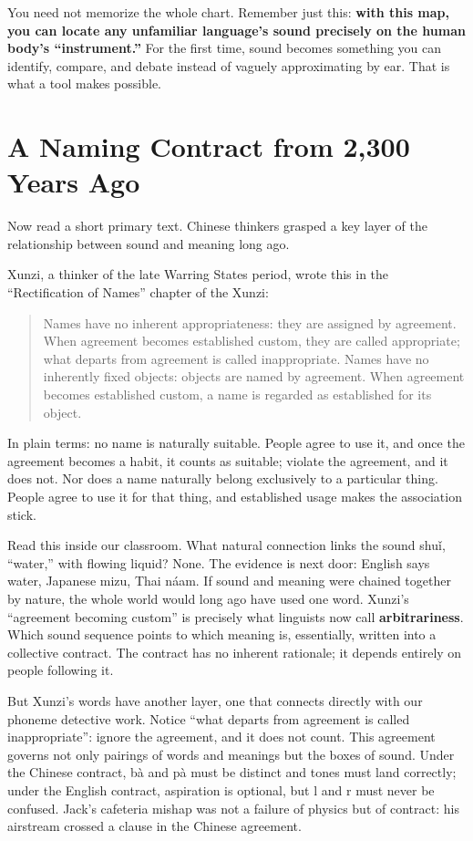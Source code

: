 You need not memorize the whole chart. Remember just this: \textbf{with this map, you can locate any unfamiliar language's sound precisely on the human body's ``instrument.''} For the first time, sound becomes something you can identify, compare, and debate instead of vaguely approximating by ear. That is what a tool makes possible.

\section{A Naming Contract from 2,300 Years Ago}
Now read a short primary text. Chinese thinkers grasped a key layer of the relationship between sound and meaning long ago.

Xunzi, a thinker of the late Warring States period, wrote this in the ``Rectification of Names'' chapter of the Xunzi:

\begin{quote}
Names have no inherent appropriateness: they are assigned by agreement. When agreement becomes established custom, they are called appropriate; what departs from agreement is called inappropriate. Names have no inherently fixed objects: objects are named by agreement. When agreement becomes established custom, a name is regarded as established for its object.
\end{quote}
In plain terms: no name is naturally suitable. People agree to use it, and once the agreement becomes a habit, it counts as suitable; violate the agreement, and it does not. Nor does a name naturally belong exclusively to a particular thing. People agree to use it for that thing, and established usage makes the association stick.

Read this inside our classroom. What natural connection links the sound shuǐ, ``water,'' with flowing liquid? None. The evidence is next door: English says water, Japanese mizu, Thai náam. If sound and meaning were chained together by nature, the whole world would long ago have used one word. Xunzi's ``agreement becoming custom'' is precisely what linguists now call \textbf{arbitrariness}. Which sound sequence points to which meaning is, essentially, written into a collective contract. The contract has no inherent rationale; it depends entirely on people following it.

But Xunzi's words have another layer, one that connects directly with our phoneme detective work. Notice ``what departs from agreement is called inappropriate'': ignore the agreement, and it does not count. This agreement governs not only pairings of words and meanings but the boxes of sound. Under the Chinese contract, bà and pà must be distinct and tones must land correctly; under the English contract, aspiration is optional, but l and r must never be confused. Jack's cafeteria mishap was not a failure of physics but of contract: his airstream crossed a clause in the Chinese agreement.

